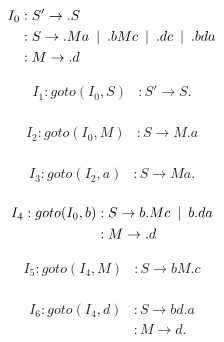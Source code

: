 \documentclass{article}
\newcommand\tab[1][5pt]{\hspace*{#1}}
\begin{document}
\begin{figure}[h!]
\begin{multicols}{2}
\begin{equation*}
\begin{aligned}
I_0 &: S' \rightarrow .S  \\
&: S \rightarrow .Ma \hspace{5pt} | \tab .bMc \tab | \tab .dc \tab | \tab .bda \\
&: M \rightarrow .d
\end{aligned}
\end{equation*}

\begin{equation*}
\begin{aligned}
I_1 : goto(I_0,S) &: S' \rightarrow S.  \\
\end{aligned}
\end{equation*}


\begin{equation*}
\begin{aligned}
I_2 : goto(I_0,M) &: S \rightarrow M.a  \\
\end{aligned}
\end{equation*}


\begin{equation*}
\begin{aligned}
I_3 : goto(I_2,a) &: S \rightarrow Ma.  \\
\end{aligned}
\end{equation*}


\begin{equation*}
\begin{aligned}
I_4 : goto(I_0,b) &: S \rightarrow b.Mc \tab | \tab b.da  \\
&: M \rightarrow .d \\
\end{aligned}
\end{equation*}


\begin{equation*}
\begin{aligned}
I_5 : goto(I_4,M) &: S \rightarrow bM.c  \\
\end{aligned}
\end{equation*}


\begin{equation*}
\begin{aligned}
I_6 : goto(I_4,d) &: S \rightarrow bd.a  \\
&: M \rightarrow d.  \\
\end{aligned}
\end{equation*}


\end{multicols}
\end{figure}
\end{document}

